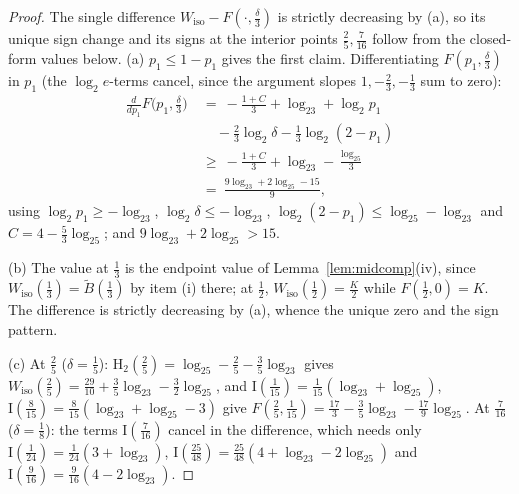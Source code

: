 \documentclass[journal]{IEEEtran}
\theoremstyle{definition}
\newcommand{\Hh}{\mathrm H_2}
\newcommand{\lgg}{\log_2}
\newcommand{\CC}{C}
\begin{document}
\begin{proof}
The single difference $W_{\mathrm{iso}}-F(\cdot,\tfrac\delta3)$ is strictly
decreasing by (a), so its unique sign change and its signs at the interior
points $\tfrac25,\tfrac7{16}$ follow from the closed-form values below.
(a) $p_1\le1-p_1$ gives the first claim. Differentiating
$F(p_1,\tfrac\delta3)$ in $p_1$ (the $\lgg e$-terms cancel, since the argument
slopes $1,-\tfrac23,-\tfrac13$ sum to zero):
\[
\begin{aligned}
  \tfrac{d}{dp_1}F\bigl(p_1,\tfrac\delta3\bigr)
  \ &=\ -\tfrac{1+\CC}{3}+\lgg3+\lgg p_1\\
  &\quad-\tfrac23\lgg\delta-\tfrac13\lgg(2-p_1)\\
  \ &\ge\ -\tfrac{1+\CC}{3}+\lgg3-\tfrac{\lgg5}3 \\
  \ &=\ \tfrac{9\lgg3+2\lgg5-15}{9},
\end{aligned}
\]
using $\lgg p_1\ge-\lgg3$, $\lgg\delta\le-\lgg3$, $\lgg(2-p_1)\le\lgg5-\lgg3$
and $\CC=4-\tfrac53\lgg5$; and $9\lgg3+2\lgg5>15$.

(b) The value at $\tfrac13$ is the endpoint value of
Lemma~\ref{lem:midcomp}(iv), since $W_{\mathrm{iso}}(\tfrac13)
=\tilde B(\tfrac13)$ by item (i) there; at $\tfrac12$,
$W_{\mathrm{iso}}(\tfrac12)=\tfrac K2$ while $F(\tfrac12,0)=K$. The
difference is strictly decreasing by (a), whence the unique zero and the sign
pattern.

(c) At $\tfrac25$ ($\delta=\tfrac15$): $\Hh(\tfrac25)
=\lgg5-\tfrac25-\tfrac35\lgg3$ gives $W_{\mathrm{iso}}(\tfrac25)
=\tfrac{29}{10}+\tfrac35\lgg3-\tfrac32\lgg5$, and
$\mathrm I(\tfrac1{15})=\tfrac1{15}(\lgg3+\lgg5)$,
$\mathrm I(\tfrac8{15})=\tfrac8{15}(\lgg3+\lgg5-3)$ give
$F(\tfrac25,\tfrac1{15})=\tfrac{17}3-\tfrac35\lgg3-\tfrac{17}9\lgg5$. At $\tfrac7{16}$ ($\delta=\tfrac18$): the terms
$\mathrm I(\tfrac7{16})$ cancel in the difference, which needs only
$\mathrm I(\tfrac1{24})=\tfrac1{24}(3+\lgg3)$,
$\mathrm I(\tfrac{25}{48})=\tfrac{25}{48}(4+\lgg3-2\lgg5)$ and
$\mathrm I(\tfrac9{16})=\tfrac9{16}(4-2\lgg3)$.
\end{proof}
\end{document}
